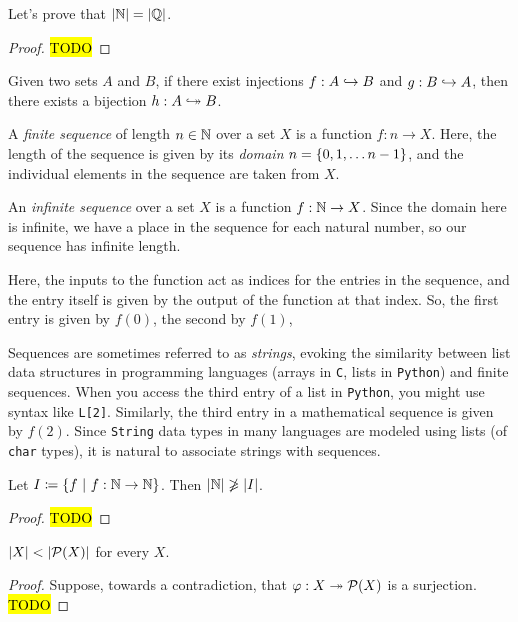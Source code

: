 \begin{example}
    Let's prove that $\lvert\mathbb{N}\rvert = \lvert\mathbb{Q}\rvert$.
\end{example}
\begin{proof}
    \hl{TODO}
\end{proof}

\begin{theorem}
    Given two sets $A$ and $B$,
    if there exist injections $f: A \hookrightarrow B$ and $g: B \hookrightarrow A$,
    then there exists a bijection $h: A \bijection B$.
\end{theorem}

\begin{definition}[Sequences]
    A \emph{finite sequence} of length $n \in \mathbb{N}$ over a set $X$ is a function $f: n \to X$.
    Here, the length of the sequence is given by its \emph{domain} $n = \set*{0, 1, \dots n - 1}$,
    and the individual elements in the sequence are taken from $X$.

    An \emph{infinite sequence} over a set $X$ is a function $f: \mathbb{N} \to X$.
    Since the domain here is infinite, we have a place in the sequence for each natural number,
    so our sequence has infinite length.

    Here, the inputs to the function act as indices for the entries in the sequence,
    and the entry itself is given by the output of the function at that index.
    So, the first entry is given by $f(0)$, the second by $f(1)$, \etc

    Sequences are sometimes referred to as \emph{strings},
    evoking the similarity between list data structures in programming languages
    (\eg arrays in \texttt{C}, lists in \texttt{Python})
    and finite sequences.
    When you access the third entry of a list in \texttt{Python},
    you might use syntax like \texttt{L[2]}.
    Similarly, the third entry in a mathematical sequence is given by $f(2)$.
    Since \texttt{String} data types in many languages are modeled using lists (\eg of \texttt{char} types),
    it is natural to associate strings with sequences.
\end{definition}

\begin{theorem}
    Let $I \defn \set*{f \suchthat f: \N \to \N}$.
    Then $\lvert\mathbb{N}\rvert \not \geqslant \lvert I\rvert$.
\end{theorem}
\begin{proof}
    \hl{TODO}
\end{proof}

\begin{theorem}
    $\cardinality{X} < \cardinality{\power{X}}$ for every $X$.
\end{theorem}
\begin{proof}
    Suppose, towards a contradiction, that $\varphi: X \surj \power{X}$ is a surjection.
    \hl{TODO}
\end{proof}


